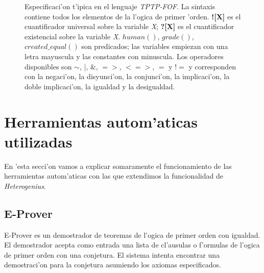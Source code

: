 \begin{figure}[]
\caption{Especificaci'on t'ipica en el lenguaje \textit{TPTP-FOF}. La sintaxis contiene todos los elementos de la l'ogica de primer 'orden. \textbf{![X]} es el cuantificador universal sobre la variable \textit{X}; \textbf{?[X]} es el cuantificador existencial sobre la variable \textit{X}. \textit{$human()$}, \textit{$grade()$}, \textit{$created\_equal()$} son predicados; las variables empiezan con una letra mayuscula y las constantes con minuscula. Los operadores disponibles son $\sim$, $|$, $\&$, $=>$, $<=>$, $=$ y $!=$ y corresponden con la negaci'on, la disyunci'on, la conjunci'on, la implicaci'on, la doble implicaci'on, la igualdad y la desigualdad.}
\label{ejemplofof}
\end{figure}


\section{Herramientas autom'aticas utilizadas}

En 'esta secci'on vamos a explicar somaramente el funcionamiento de las herramientas autom'aticas con las que extendimos la funcionalidad de \textit{Heterogenius}.

\subsection{E-Prover}

E-Prover es un demostrador de teoremas de l'ogica de primer orden con igualdad. El demostrador acepta como entrada una lista de cl'ausulas o f'ormulas de l'ogica de primer orden con una conjetura. El sistema intenta encontrar una demostraci'on para la conjetura asumiendo los axiomas especificados.

